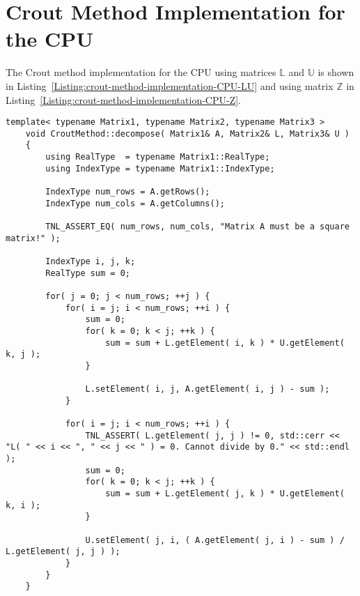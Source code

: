 \newpage 									%
\appendix 								 	%


\chapter{Crout Method Implementation for the CPU}\label{Attachment:crout-method-implementation-CPU}
The Crout method implementation for the CPU using matrices $ \mathbb{L} $ and $ \mathbb{U} $ is shown in Listing~\ref{Listing:crout-method-implementation-CPU-LU} and using matrix $ \mathbb{Z} $ in Listing~\ref{Listing:crout-method-implementation-CPU-Z}.
\begin{lstlisting}[language={},caption={Implementation of the Crout method on the CPU using matrices $ \mathbb{L} $ and $ \mathbb{U} $. All matrix and variable types are obtained from template arguments of the method. Taken from the Decomposition project repository on GitLab\protect\footref{Footnote:decomposition-project-gitlab-url}.},label={Listing:crout-method-implementation-CPU-LU}]
	template< typename Matrix1, typename Matrix2, typename Matrix3 >
	void CroutMethod::decompose( Matrix1& A, Matrix2& L, Matrix3& U )
	{
		using RealType  = typename Matrix1::RealType;
		using IndexType = typename Matrix1::IndexType;
		
		IndexType num_rows = A.getRows();
		IndexType num_cols = A.getColumns();
		
		TNL_ASSERT_EQ( num_rows, num_cols, "Matrix A must be a square matrix!" );
		
		IndexType i, j, k;
		RealType sum = 0;
		
		for( j = 0; j < num_rows; ++j )	{
			for( i = j; i < num_rows; ++i ) {
				sum = 0;
				for( k = 0; k < j; ++k ) {
					sum = sum + L.getElement( i, k ) * U.getElement( k, j );
				}
				
				L.setElement( i, j, A.getElement( i, j ) - sum );
			}
			
			for( i = j; i < num_rows; ++i ) {
				TNL_ASSERT( L.getElement( j, j ) != 0, std::cerr << "L( " << i << ", " << j << " ) = 0. Cannot divide by 0." << std::endl );
				sum = 0;
				for( k = 0; k < j; ++k ) {
					sum = sum + L.getElement( j, k ) * U.getElement( k, i );
				}
				
				U.setElement( j, i, ( A.getElement( j, i ) - sum ) / L.getElement( j, j ) );
			}
		}	
	}
\end{lstlisting}

